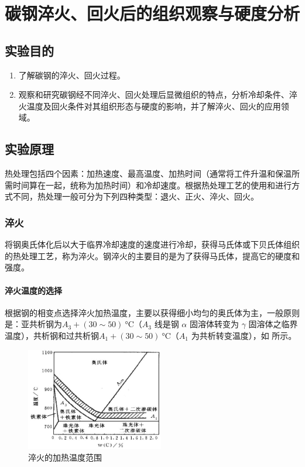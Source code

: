 \chapter{碳钢淬火、回火后的组织观察与硬度分析}
\section{实验目的}
    \begin{enumerate}
        \item 了解碳钢的淬火、回火过程。
        \item 观察和研究碳钢经不同淬火、回火处理后显微组织的特点，分析冷却条件、淬火温度及回火条件对其组织形态与硬度的影响，并了解淬火、回火的应用领域。
    \end{enumerate}
\section{实验原理}%
    热处理包括四个因素：加热速度、最高温度、加热时间（通常将工件升温和保温所需时间算在一起，统称为加热时间）和冷却速度。根据热处理工艺的使用和进行方式不同，热处理一般可分为下列四种类型：退火、正火、淬火、回火。\par
    \subsection{淬火}
        将钢奥氏体化后以大于临界冷却速度的速度进行冷却，获得马氏体或下贝氏体组织的热处理工艺，称为淬火。钢淬火的主要目的是为了获得马氏体，提高它的硬度和强度。
        \subsubsection{淬火温度的选择}
            根据钢的相变点选择淬火加热温度，主要以获得细小均匀的奥氏体为主，一般原则是：亚共析钢为$A_{3}+(30{\sim}50)~\unit{\degreeCelsius}$（$A_3$ 线是钢 $\alpha$ 固溶体转变为 $\gamma$ 固溶体之临界温度），共析钢和过共析钢$A_{1}+(30{\sim}50)~\unit{\degreeCelsius}$（$A_1$ 为共析转变温度），如 所示。
            \begin{figure}[!ht]
                \caption{淬火的加热温度范围\label{fig:A4.1}}
                \includegraphics[width=60mm]{img/A4/fig1.jpg}
            \end{figure}
